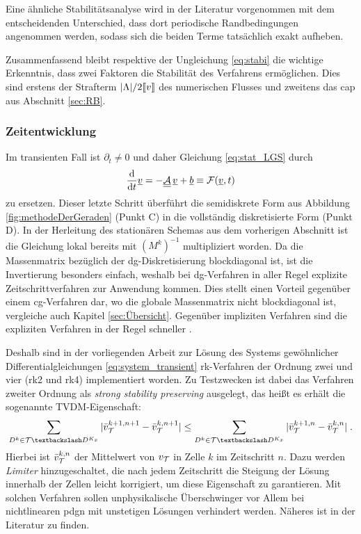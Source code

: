 Eine ähnliche Stabilitätsanalyse wird in der Literatur \cite{NLS} vorgenommen mit dem entscheidenden Unterschied, dass dort periodische Randbedingungen angenommen werden, sodass sich die beiden Terme tatsächlich exakt aufheben.

Zusammenfassend bleibt respektive der Ungleichung \eqref{eq:stabi} die wichtige Erkenntnis, dass zwei Faktoren die Stabilität des Verfahrens ermöglichen. Dies sind erstens der Strafterm $|\Lambda|/2\llbracket v \rrbracket$ des numerischen Flusses und zweitens das \ac{cap} aus Abschnitt \ref{sec:RB}.



\subsubsection{Zeitentwicklung} \label{sec:timestepping}  
Im transienten Fall ist $\partial_t\neq 0$ und daher Gleichung \eqref{eq:stat_LGS} durch
\begin{equation}
  \frac{\mathrm{d}}{\mathrm{d}t} \underline{v} = -\underline{\underline{\mathcal{A}}}\,\underline{v} + \underline{b} \equiv\mathcal{F}(\underline{v},t)
  \label{eq:system_transient}
\end{equation}
zu ersetzen. Dieser letzte Schritt überführt die semidiskrete Form aus Abbildung \ref{fig:methodeDerGeraden} (Punkt C) in die vollständig diskretisierte Form (Punkt D). In der Herleitung des stationären Schemas aus dem vorherigen Abschnitt ist die Gleichung lokal bereits mit $(M^k)^{-1}$ multipliziert worden. Da die Massenmatrix bezüglich der \ac{dg}-Diskretisierung blockdiagonal ist, ist die Invertierung besonders einfach, weshalb bei \ac{dg}-Verfahren in aller Regel explizite Zeitschrittverfahren zur Anwendung kommen. Dies stellt einen Vorteil gegenüber einem \ac{cg}-Verfahren dar, wo die globale Massenmatrix nicht blockdiagonal ist, vergleiche auch Kapitel \ref{sec:Übersicht}. Gegenüber impliziten Verfahren sind die expliziten Verfahren in der Regel schneller \cite{buchLeveque}.

Deshalb sind in der vorliegenden Arbeit zur Lösung des Systems gewöhnlicher Differentialgleichungen \eqref{eq:system_transient} \ac{rk}-Verfahren der Ordnung zwei und vier (\ac{rk}2 und \ac{rk}4) implementiert worden. Zu Testzwecken ist dabei das Verfahren zweiter Ordnung als \emph{strong stability preserving} ausgelegt, das heißt es erhält die sogenannte TVDM-Eigenschaft:
\begin{equation*}
  \sum_{D^k\in\mathcal{T}\textbackslash D^{K_x}} |\bar{v}\fin^{k+1,n+1} - \bar{v}\fin^{k,n+1}| \leq\sum_{D^k\in\mathcal{T}\textbackslash D^{K_x}} |\bar{v}\fin^{k+1,n} - \bar{v}\fin^{k,n}| \; .
\end{equation*}
Hierbei ist $\bar{v}_{\mathcal{T}}^{k,n}$ der Mittelwert von $v_{\mathcal{T}}$ in Zelle $k$ im Zeitschritt $n$. Dazu werden \emph{Limiter} hinzugeschaltet, die nach jedem Zeitschritt die Steigung der Lösung innerhalb der Zellen leicht korrigiert, um diese Eigenschaft zu garantieren. Mit solchen Verfahren sollen unphysikalische Überschwinger vor Allem bei nichtlinearen \ac{pdg}n mit unstetigen Lösungen verhindert werden. Näheres ist in der Literatur \cite{buch} zu finden.

